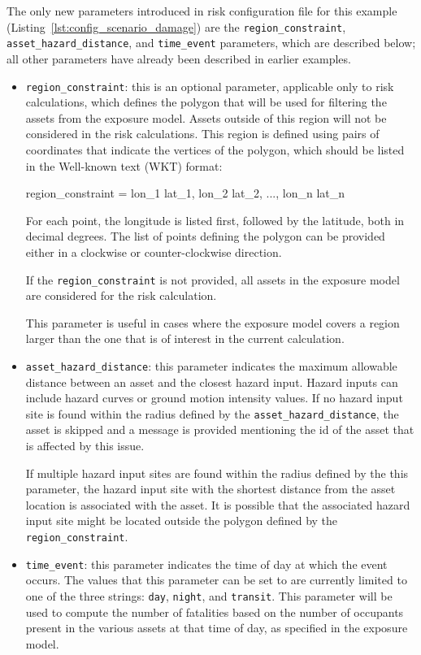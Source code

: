 The only new parameters introduced in risk configuration file for this example
(Listing~\ref{lst:config_scenario_damage}) are the \Verb+region_constraint+,
\Verb+asset_hazard_distance+, and \Verb+time_event+ parameters, which are
described below; all other parameters have already been described in earlier
examples.

\begin{itemize}

  \item \Verb+region_constraint+: this is an optional parameter, applicable
    only to risk calculations, which defines the polygon that will be used for
    filtering the assets from the exposure model. Assets outside of this region
    will not be considered in the risk calculations. This region is defined
    using pairs of coordinates that indicate the vertices of the polygon, which
    should be listed in the Well-known text (WKT) format:

    region\_constraint = lon\_1 lat\_1, lon\_2 lat\_2, ..., lon\_n lat\_n

    For each point, the longitude is listed first, followed by the latitude,
    both in decimal degrees. The list of points defining the polygon can be
    provided either in a clockwise or counter-clockwise direction.

    If the \Verb+region_constraint+ is not provided, all assets in the exposure
    model are considered for the risk calculation.

    This parameter is useful in cases where the exposure model covers a region
    larger than the one that is of interest in the current calculation.

  \item \Verb+asset_hazard_distance+: this parameter indicates the maximum
    allowable distance between an \gls{asset} and the closest hazard input.
    Hazard inputs can include hazard curves or ground motion intensity values.
    If no hazard input site is found within the radius defined by the
    \Verb+asset_hazard_distance+, the asset is skipped and a message is
    provided mentioning the id of the asset that is affected by this issue.

    If multiple hazard input sites are found within the radius defined by the
    this parameter, the hazard input site with the shortest distance from the
    asset location is associated with the asset. It is possible that the
    associated hazard input site might be located outside the polygon defined
    by the \Verb+region_constraint+.

  \item \Verb+time_event+: this parameter indicates the time of day at which
    the event occurs. The values that this parameter can be set to are 
    currently limited to one of the three strings: \Verb+day+, \Verb+night+,
    and \Verb+transit+. This parameter will be used to compute the number of
    fatalities based on the number of occupants present in the various
    \glspl{asset} at that time of day, as specified in the exposure model.

\end{itemize}


